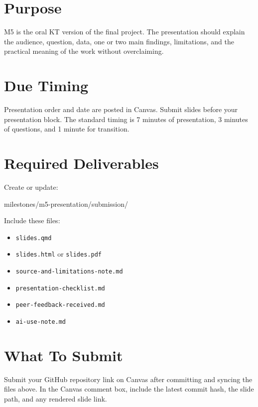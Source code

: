 \documentclass[
  letterpaper,
  DIV=11,
  numbers=noendperiod,
  oneside]{scrreprt}
\newenvironment{Shaded}{\begin{snugshade}}{\end{snugshade}}
\newcommand{\NormalTok}[1]{\textcolor[rgb]{0.00,0.23,0.31}{#1}}
\providecommand{\tightlist}{%
  \setlength{\itemsep}{0pt}\setlength{\parskip}{0pt}}
\begin{document}
\section{Purpose}\label{purpose-6}

M5 is the oral KT version of the final project. The presentation should
explain the audience, question, data, one or two main findings,
limitations, and the practical meaning of the work without overclaiming.

\section{Due Timing}\label{due-timing-5}

Presentation order and date are posted in Canvas. Submit slides before
your presentation block. The standard timing is 7 minutes of
presentation, 3 minutes of questions, and 1 minute for transition.

\section{Required Deliverables}\label{required-deliverables-5}

Create or update:

\begin{Shaded}
\begin{Highlighting}[numbers=left,,]
\NormalTok{milestones/m5{-}presentation/submission/}
\end{Highlighting}
\end{Shaded}

Include these files:

\begin{itemize}
\tightlist
\item
  \texttt{slides.qmd}
\item
  \texttt{slides.html} or \texttt{slides.pdf}
\item
  \texttt{source-and-limitations-note.md}
\item
  \texttt{presentation-checklist.md}
\item
  \texttt{peer-feedback-received.md}
\item
  \texttt{ai-use-note.md}
\end{itemize}

\section{What To Submit}\label{what-to-submit-5}

Submit your GitHub repository link on Canvas after committing and
syncing the files above. In the Canvas comment box, include the latest
commit hash, the slide path, and any rendered slide link.
\end{document}
